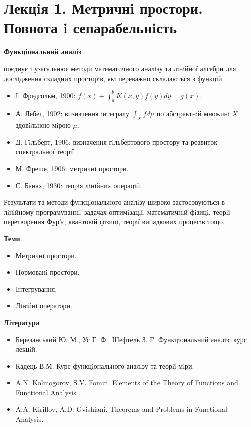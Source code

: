 \chapter[Метричнi простори. Повнота i сепарабельнiсть]{Лекцiя 1. Метричнi простори. Повнота i сепарабельнiсть}



\textbf{Функцiональний аналiз}

поєднує i узагальнює методи математичного аналiзу та лiнiйної алгебри для
дослiдження складних просторiв, якi переважно складаються з функцiй.

\begin{itemize}
    \item I. Фредгольм, 1900: $f(x) + \int_{a}^{b} K(x, y) f(y) dy = g(x)$.
    \item А. Лебег, 1902: визначення iнтегралу $\int_{X} f d \mu$ по абстрактнiй
        множинi $X$ здовiльною мiрою $\mu$.
    \item Д. Гiльберт, 1906: визначення гiльбертового простору та розвиток
        спектральної теорiї.
    \item М. Фреше, 1906: метричнi простори.
    \item С. Банах, 1930: теорiя лiнiйних операцiй.
\end{itemize}

Результати та методи функцiонального аналiзу широко застосовуються в
лiнiйному програмуваннi, задачах оптимiзацiї, математичнiй фiзицi, теорiї
перетворення Фур’є, квантовiй фiзицi, теорiї випадкових процесiв тощо.

\textbf{Теми}
\begin{itemize}
    \item Метричнi простори.
    \item Нормованi простори.
    \item Iнтегрування.
    \item Лiнiйнi оператори.
\end{itemize}

\textbf{Лiтература}
\begin{itemize}
    \item Березанський Ю. М., Ус Г. Ф., Шефтель З. Г. Функцiональний аналiз:
        курс лекцiй.
    \item Кадець В.М. Курс функцiонального аналiзу та теорiї мiри.
    \item A.N. Kolmogorov, S.V. Fomin. Elements of the Theory of Functions and
        Functional Analysis.
    \item A.A. Kirillov, A.D. Gvishiani. Theorems and Problems in Functional Analysis.
\end{itemize}

